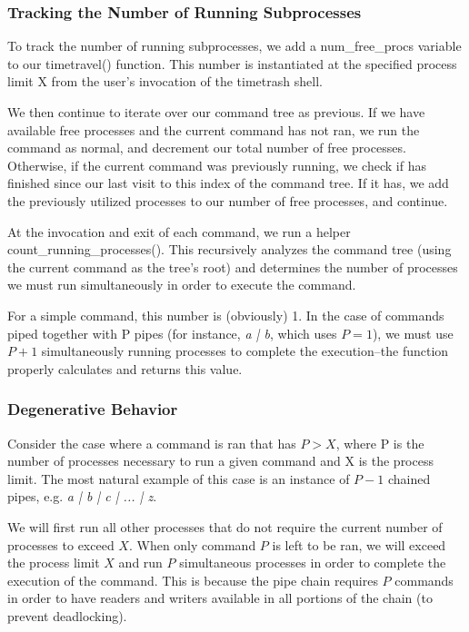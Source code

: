 \documentclass[paper=letter, fontsize=11pt]{scrartcl} %
\begin{document}
\subsubsection{Tracking the Number of Running Subprocesses}
To track the number of running subprocesses, we add a num\_free\_procs variable to our timetravel() function. This number is instantiated at the specified process limit X from the user's invocation of the timetrash shell.

We then continue to iterate over our command tree as previous. If we have available free processes and the current command has not ran, we run the command as normal, and decrement our total number of free processes. Otherwise, if the current command was previously running, we check if has finished since our last visit to this index of the command tree. If it has, we add the previously utilized processes to our number of free processes, and continue.

At the invocation and exit of each command, we run a helper count\_running\_processes(). This recursively analyzes the command tree (using the current command as the tree's root) and determines the number of processes we must run simultaneously in order to execute the command.

For a simple command, this number is (obviously) 1. In the case of commands piped together with P pipes (for instance, \emph{a | b}, which uses $P = 1$), we must use $P + 1$ simultaneously running processes to complete the execution--the function properly calculates and returns this value.

\subsubsection{Degenerative Behavior}
Consider the case where a command is ran that has $P > X$, where P is the number of processes necessary to run a given command and X is the process limit. The most natural example of this case is an instance of $P - 1$ chained pipes, e.g. \emph{a | b | c | ... | z}.

We will first run all other processes that do not require the current number of processes to exceed $X$. When only command $P$ is left to be ran, we will exceed the process limit $X$ and run $P$ simultaneous processes in order to complete the execution of the command. This is because the pipe chain requires $P$ commands in order to have readers and writers available in all portions of the chain (to prevent deadlocking).
\end{document}
